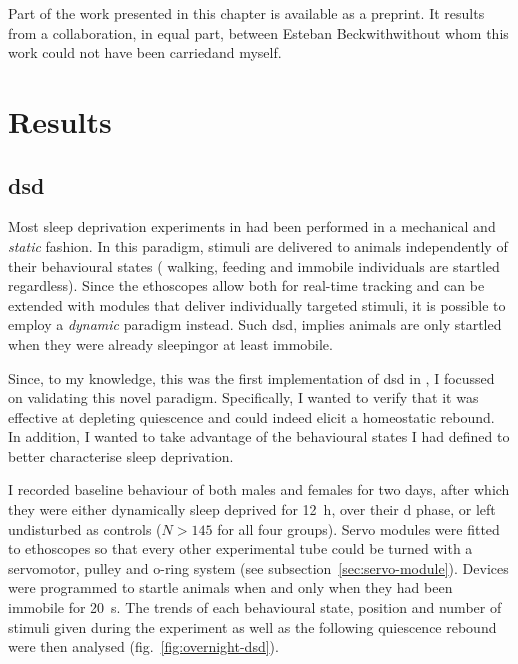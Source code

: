 Part of the work presented in this chapter is available as a preprint\cite{geissmann_most_2018}. 
It results from a collaboration, in equal part, between Esteban Beckwith\emd{}without whom this work could not have been carried\emd{}and myself.


\section{Results}
\subsection{\acrfull{dsd}}

Most sleep deprivation experiments in \dmel{} had been performed in a mechanical and \emph{static} fashion. 
In this paradigm, stimuli are delivered to animals independently of their behavioural states (\ie{} walking, feeding and immobile individuals are startled regardless).
Since the ethoscopes allow both for real-time tracking and can be extended with modules that deliver individually targeted stimuli, it is possible
to employ a \emph{dynamic} paradigm instead.
Such \gls{dsd}, implies animals are only startled when they were already sleeping\emd{}or at least immobile.

Since, to my knowledge, this was the first implementation of \gls{dsd} in \dmel, I focussed on validating this novel paradigm.
Specifically, I wanted to verify that it was effective at depleting quiescence and could indeed elicit a homeostatic rebound.
In addition, I wanted to take advantage of the behavioural states I had defined to better characterise sleep deprivation.

I recorded baseline behaviour of both males and females for two days, after which they were either dynamically sleep deprived for 12~h, over their \gls{d} phase, or left undisturbed as controls ($N > 145$ for all four groups).
Servo modules were fitted to ethoscopes so that every other experimental tube could be turned with a servomotor, pulley and o-ring system (see subsection~\ref{sec:servo-module}).
Devices were programmed to startle animals when and only when they had been immobile for 20~s.
The trends of each behavioural state, position and  number of stimuli given during the experiment as well as the following quiescence rebound were then analysed (fig.~\ref{fig:overnight-dsd}).

